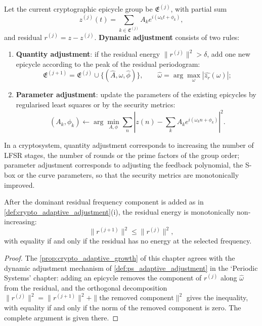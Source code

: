 \begin{definition}\label{def:crypto_adaptive_adjustment}
Let the current cryptographic epicycle group be \(\mathfrak E^{(j)}\), with partial sum
\[
z^{(j)}(t)=\sum_{k\in\mathfrak E^{(j)}}A_k e^{i(\omega_k t+\phi_k)},
\]
and residual \(r^{(j)}=z-z^{(j)}\). \textbf{Dynamic adjustment} consists of two rules:
\begin{enumerate}[label=(\roman*)]
    \item \textbf{Quantity adjustment}: if the residual energy \(\|r^{(j)}\|^2>\delta\), add one new epicycle according to the peak of the residual periodogram:
    \[
    \mathfrak E^{(j+1)}=\mathfrak E^{(j)}\cup\{(\hat A,\hat\omega,\hat\phi)\},\qquad
    \hat\omega=\arg\max_\omega|\widehat{z_r}(\omega)|;
    \]
    \item \textbf{Parameter adjustment}: update the parameters of the existing epicycles by regularised least squares or by the security metrics:
    \[
    (A_k,\phi_k)\leftarrow\arg\min_{A,\phi}\sum_n\left|z(n)-\sum_kA_ke^{i(\omega_kn+\phi_k)}\right|^2.
    \]
\end{enumerate}
In a cryptosystem, quantity adjustment corresponds to increasing the number of LFSR stages, the number of rounds or the prime factors of the group order; parameter adjustment corresponds to adjusting the feedback polynomial, the S-box or the curve parameters, so that the security metrics are monotonically improved.
\end{definition}

\begin{proposition}\label{prop:crypto_adaptive_growth}
After the dominant residual frequency component is added as in \cref{def:crypto_adaptive_adjustment}(i), the residual energy is monotonically non-increasing:
\[
\|r^{(j+1)}\|^2\le\|r^{(j)}\|^2,
\]
with equality if and only if the residual has no energy at the selected frequency.
\end{proposition}

\begin{proof}
The \cref{prop:crypto_adaptive_growth} of this chapter agrees with the dynamic adjustment mechanism of \cref{def:ps_adaptive_adjustment} in the `Periodic Systems' chapter:
adding an epicycle removes the component of $r^{(j)}$ along $\hat\omega$ from the residual, and the orthogonal decomposition
$\|r^{(j)}\|^2=\|r^{(j+1)}\|^2+\|\text{the removed component}\|^2$ gives the inequality,
with equality if and only if the norm of the removed component is zero. The complete argument is given there.
\end{proof}

